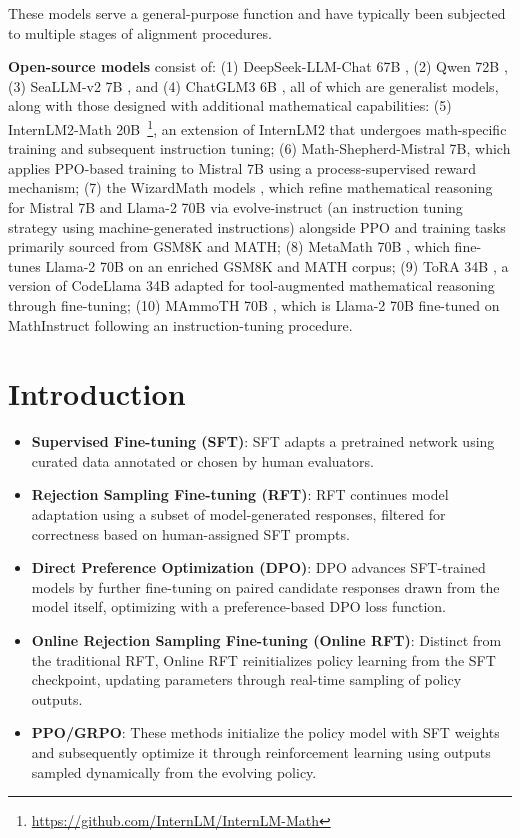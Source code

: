 These models serve a general-purpose function and have typically been subjected to multiple stages of alignment procedures.
    \item \textbf{Open-source models} consist of: (1) DeepSeek-LLM-Chat 67B \citep{deepseek-llm}, (2) Qwen 72B \citep{qwen}, (3) SeaLLM-v2 7B \citep{seallm}, and (4) ChatGLM3 6B \citep{chatglm3}, all of which are generalist models, along with those designed with additional mathematical capabilities: (5) InternLM2-Math 20B~\footnote{\url{https://github.com/InternLM/InternLM-Math}}, an extension of InternLM2 that undergoes math-specific training and subsequent instruction tuning; (6) Math-Shepherd-Mistral 7B, which applies PPO-based training \citep{schulman2017proximal} to Mistral 7B \citep{mistral} using a process-supervised reward mechanism; (7) the WizardMath models \citep{wizardmath}, which refine mathematical reasoning for Mistral 7B and Llama-2 70B \citep{llama2} via evolve-instruct (an instruction tuning strategy using machine-generated instructions) alongside PPO and training tasks primarily sourced from GSM8K and MATH; (8) MetaMath 70B \citep{metamath}, which fine-tunes Llama-2 70B on an enriched GSM8K and MATH corpus; (9) ToRA 34B \cite{tora}, a version of CodeLlama 34B adapted for tool-augmented mathematical reasoning through fine-tuning; (10) MAmmoTH 70B \citep{MathInstruct}, which is Llama-2 70B fine-tuned on MathInstruct following an instruction-tuning procedure.

\section{Introduction}

\begin{itemize}
    \item  \textbf{Supervised Fine-tuning (SFT)}: SFT adapts a pretrained network using curated data annotated or chosen by human evaluators.
    \item \textbf{Rejection Sampling Fine-tuning (RFT)}: RFT continues model adaptation using a subset of model-generated responses, filtered for correctness based on human-assigned SFT prompts.
    \item \textbf{Direct Preference Optimization (DPO)}: DPO advances SFT-trained models by further fine-tuning on paired candidate responses drawn from the model itself, optimizing with a preference-based DPO loss function.
    \item \textbf{Online Rejection Sampling Fine-tuning (Online RFT)}: Distinct from the traditional RFT, Online RFT reinitializes policy learning from the SFT checkpoint, updating parameters through real-time sampling of policy outputs.
    \item \textbf{PPO/GRPO}: These methods initialize the policy model with SFT weights and subsequently optimize it through reinforcement learning using outputs sampled dynamically from the evolving policy.
\end{itemize}

